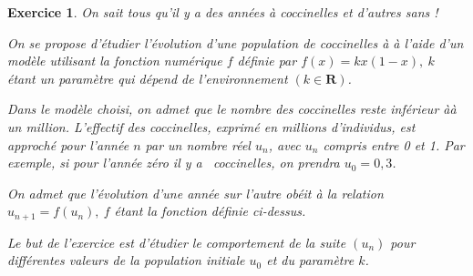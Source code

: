 \documentclass[12pt,a4paper,french]{article}
\newcommand{\R}{\mathbf{R}}
\theoremstyle{break}
\newtheorem{exercice}{Exercice}
\theoremstyle{nonumberplain}
\theoremstyle{nonumberbreak}
\begin{document}
\pagebreak

\begin{exercice}
  On sait tous qu'il y a des années à coccinelles et d'autres sans !

  On se propose d'étudier l'évolution d'une population de coccinelles à
  à l'aide d'un modèle utilisant la fonction numérique $f$ définie par
  $f(x) = kx(1 - x),~ k$ étant un paramètre qui dépend de
  l'environnement $(k \in \R)$.

  Dans le modèle choisi, on admet que le nombre des coccinelles reste
  inférieur àà un million. L'effectif des coccinelles, exprimé en
  millions d'individus, est approché pour l'année $n$ par un nombre réel
  $u_{n}$, avec $u_{n}$ compris entre 0 et 1. Par exemple, si pour
  l'année zéro il y a ~coccinelles, on prendra $u_{0} =
  0,3$.

  On admet que l'évolution d'une année sur l'autre obéit à la relation
  $u_{n+1} = f\left(u_{n}\right),~ f$ étant la fonction définie
  ci-dessus.

  Le but de l'exercice est d'étudier le comportement de la suite
  $\left(u_{n}\right)$ pour différentes valeurs de la population
  initiale $u_{0}$ et du paramètre $k$.


\end{exercice}
\end{document}

